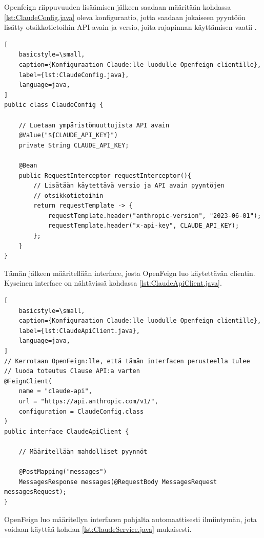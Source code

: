 Openfeign riippuvuuden lisäämisen jälkeen saadaan määritään kohdassa
\ref{lst:ClaudeConfig.java} oleva konfiguraatio, jotta saadaan jokaiseen
pyyntöön lisätty otsikkotietoihin API-avain ja versio, joita rajapinnan
käyttämisen vaatii \parencite{anthropicAPIDocsVersions}
\parencite{anthropicAPIDocsGettingStarted}.

\begin{lstlisting}[
    basicstyle=\small,
    caption={Konfiguraation Claude:lle luodulle Openfeign clientille},
    label={lst:ClaudeConfig.java},
    language=java,
]
public class ClaudeConfig {

    // Luetaan ympäristömuuttujista API avain
    @Value("${CLAUDE_API_KEY}")
    private String CLAUDE_API_KEY;

    @Bean
    public RequestInterceptor requestInterceptor(){
        // Lisätään käytettävä versio ja API avain pyyntöjen
        // otsikkotietoihin
        return requestTemplate -> {
            requestTemplate.header("anthropic-version", "2023-06-01");
            requestTemplate.header("x-api-key", CLAUDE_API_KEY);
        };
    }
}
\end{lstlisting}

Tämän jälkeen määritellään interface, josta OpenFeign luo käytettävän clientin.
Kyseinen interface on nähtävissä kohdassa \ref{lst:ClaudeApiClient.java}.

\begin{lstlisting}[
    basicstyle=\small,
    caption={Konfiguraation Claude:lle luodulle Openfeign clientille},
    label={lst:ClaudeApiClient.java},
    language=java,
]
// Kerrotaan OpenFeign:lle, että tämän interfacen perusteella tulee
// luoda toteutus Clause API:a varten
@FeignClient(
    name = "claude-api",
    url = "https://api.anthropic.com/v1/",
    configuration = ClaudeConfig.class
)
public interface ClaudeApiClient {

    // Määritellään mahdolliset pyynnöt

    @PostMapping("messages")
    MessagesResponse messages(@RequestBody MessagesRequest messagesRequest);
}
\end{lstlisting}

OpenFeign luo määritellyn interfacen pohjalta automaattisesti ilmiintymän, jota
voidaan käyttää kohdan \ref{lst:ClaudeService.java} mukaisesti.

